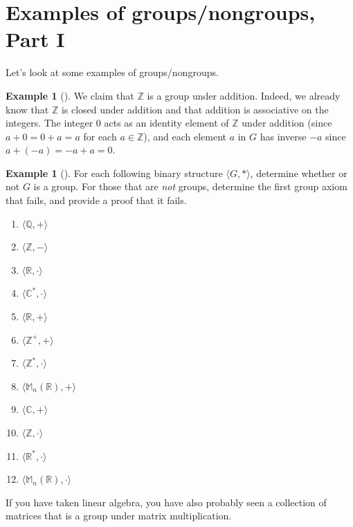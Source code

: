 \documentclass[10pt,]{book}
\theoremstyle{plain}
\theoremstyle{definition}
\theoremstyle{definition}
\theoremstyle{definition}
\newtheorem{example}[theorem]{Example}
\theoremstyle{definition}
\numberwithin{equation}{section}
\def\Z{\mathbb{Z}}
\def\R{\mathbb{R}}
\def\Q{\mathbb{Q}}
\def\C{\mathbb{C}}
\def\M{\mathbb{M}}
\begin{document}
\section[{Examples of groups/nongroups, Part I}]{Examples of groups/nongroups, Part I}\label{section-6}
Let's look at some examples of groups/nongroups.%
\begin{example}[]\label{example-10}
We claim that \(\Z\) is a group under addition. Indeed, we already know that \(\Z\) is closed under addition and that addition is associative on the integers. The integer \(0\) acts as an identity element of \(\Z\) under addition (since \(a+0=0+a=a\) for each \(a\in
\Z\)), and each element \(a\) in \(G\) has inverse \(-a\) since \(a+(-a)=-a+a=0\).%
\end{example}
\begin{example}[]\label{example-11}
For each following binary structure \(\langle G,*\rangle\), determine whether or not \(G\) is a group. For those that are \emph{not} groups, determine the first group axiom  that fails, and provide a proof that it fails. \leavevmode%
\begin{multicols}{4}
\begin{enumerate}
\item\hypertarget{li-79}{}\(\langle \Q,+\rangle\)%
\item\hypertarget{li-80}{}\(\langle \Z,-\rangle\)%
\item\hypertarget{li-81}{}\(\langle \R,\cdot\rangle\)%
\item\hypertarget{li-82}{}\(\langle \C^*,\cdot\rangle\)%
\item\hypertarget{li-83}{}\(\langle \R,+\rangle\)%
\item\hypertarget{li-84}{}\(\langle \Z^+,+\rangle\)%
\item\hypertarget{li-85}{}\(\langle \Z^*,\cdot\rangle\)%
\item\hypertarget{li-86}{}\(\langle \M_n(\R),+\rangle\)%
\item\hypertarget{li-87}{}\(\langle \C,+\rangle\)%
\item\hypertarget{li-88}{}\(\langle \Z,\cdot\rangle\)%
\item\hypertarget{li-89}{}\(\langle \R^*,\cdot\rangle\)%
\item\hypertarget{li-90}{}\(\langle \M_n(\R),\cdot\rangle\)%
\end{enumerate}
\end{multicols}
%
\end{example}
If you have taken linear algebra, you have also probably seen a collection of matrices that is a group under matrix multiplication.%
\end{document}
